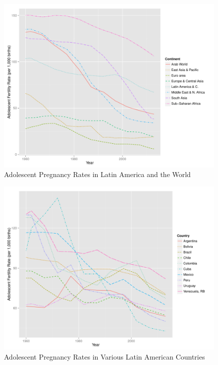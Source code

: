 \documentclass[10pt,letterpaper,subeqn]{beamer}
\begin{document}
\begin{frame}[label=cont]
\begin{figure}
\begin{center}
\caption{Adolescent Pregnancy Rates in Latin America and the World}
\includegraphics[scale=0.45]{./figures/Continents.pdf}
\end{center}
\end{figure}
\end{frame}

\begin{frame}[label=coun]
\begin{figure}
\begin{center}
\caption{Adolescent Pregnancy Rates in Various Latin American Countries}
\includegraphics[scale=0.45]{./figures/Countries.pdf}
\end{center}
\end{figure}
\end{frame}
\end{document}
